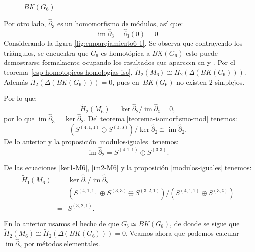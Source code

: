 \documentclass[12pt]{book}
\theoremstyle{definition}
\DeclareMathOperator{\im}{im}
\newcounter{in}
\newcounter{ini}
\begin{document}
\begin{figure}[h]
\begin{center}
\begin{minipage}{0.45\linewidth}
      \caption{$BK(G_{6})$}
      \label{grafica-contraible-M6}
    \end{minipage}
  \end{center}
\end{figure}

Por otro lado, $\widehat\partial_{3}$ es un homomorfismo de módulos, así que:
\begin{equation*}
  \im\widehat\partial_{3}=\widehat\partial_{3}(0)=0.
  \label{im3-KM5}
\end{equation*}
Considerando la figura \ref{fig:emparejamiento6-1}. Se observa que contrayendo los
triángulos, se encuentra que $G_{6}$ es homotópica a $BK(G_{6})$ esto
puede demostrarse formalmente ocupando los resultados que aparecen en
\cite{LPV08a} y \cite{Pri92}. Por el teorema~\ref{esp-homotopicos-homologias-iso}, $\widetilde
H_{2}(M_{6})\cong\widetilde H_{2}(\Delta(BK(G_{6})))$. Además
$\widetilde H_{2}(\Delta(BK(G_{6})))=0$, pues en~$BK(G_{6})$ no existen $2$-simplejos.

Por lo que:
\begin{equation*}
  \widetilde H_{2}(M_{6})=\ker \widehat\partial_{2}/\im \widehat\partial_{3}=0,
\end{equation*}
por lo que $\im \widehat\partial_{3}=\ker \widehat\partial_{2}$. Del teorema
\ref{teorema-isomorfismo-mod} tenemos:
$$(S^{(4,1,1)}\oplus S^{(3,3)})/\ker \widehat\partial_{2}\cong \im \widehat\partial_{2}.$$
De lo anterior y la proposición \ref{modulos-iguales} tenemos:
\begin{equation}
\im \widehat\partial_{2}=S^{(4,1,1)}\oplus S^{(3,3)}.
\label{im2-M6}
\end{equation}

De las ecuaciones \ref{ker1-M6}, \ref{im2-M6} y la proposición
\ref{modulos-iguales} tenemos:
\begin{eqnarray*}
  \widetilde H_{1}(M_{6})&=&\ker \widehat\partial_{1}/\im
  \widehat\partial_{2}\\
  &=&(S^{(4,1,1)}\oplus S^{(3,3)}\oplus
  S^{(3,2,1)})/(S^{(4,1,1)}\oplus S^{(3,3)})\\
  &=&S^{(3,2,1)}.
\end{eqnarray*}

En lo anterior usamos el hecho de que $G_{6}\simeq BK(G_{6})$, de donde
se sigue que $\widetilde H_{2}(M_{6})\cong\widetilde
H_{2}(\Delta(BK(G_{6})))=0$. Veamos ahora
que podemos calcular $\im \widehat\partial_{2}$ por métodos elementales.
\end{document}
